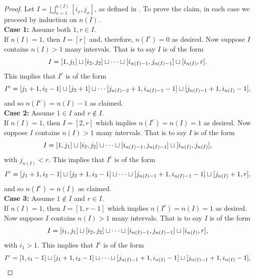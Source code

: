 \documentclass[10pt]{article}
\begin{document}
\begin{proof}
    Let $I=\bigsqcup_{x=1}^{n(I)}[i_x,j_x]$, as defined in . To prove the claim, in each case we proceed by induction on $n(I)$. \\ 
    \textbf{Case 1:} Assume both $1,r\in I$. \\
    If $n(I)=1$, then $I=[r]$ and, therefore, $n(I^c)=0$ as desired. Now suppose $I$ contains $n(I)>1$ many intervals. That is to say $I$ is of the form
    \begin{equation}
        I = [1,j_1]\sqcup [i_2,j_2] \sqcup \cdots \sqcup [i_{n(I)-1},j_{n(I)-1}]\sqcup [i_{n(I)},r].\notag
    \end{equation}
    This implies that $I^c$ is of the form 
    \begin{equation}
        I^c = [j_1+1,i_2-1] \sqcup [j_2+1] \sqcup \cdots [j_{n(I)-2}+1,i_{n(I)-1}-1] \sqcup [j_{n(I)-1}+1,i_{n(I)}-1],\notag
    \end{equation}
    and so $n(I^c)=n(I)-1$ as claimed.\\
    \textbf{Case 2:} Assume $1\in I$ and $r\notin I$. \\
    If $n(I)=1$, then $I=[2,r]$ which implies $n(I^c)=n(I)=1$ as desired. Now suppose $I$ contains $n(I)>1$ many intervals. That is to say $I$ is of the form
    \begin{equation}
        I = [1,j_1] \sqcup [i_2,j_2] \sqcup \cdots \sqcup [i_{n(I)-1},j_{n(I)-1}] \sqcup [i_{n(I)},j_{n(I)}],\notag
    \end{equation}
    with $j_{n(I)}<r$. This implies that $I^c$ is of the form
    \begin{equation}
        I^c = [j_1+1,i_2-1]\sqcup [j_2+1,i_3-1]\sqcup \cdots \sqcup [j_{n(I)-1}+1,i_{n(I)-1}-1] \sqcup [j_{n(I)}+1,r],\notag
    \end{equation}
    and so $n(I^c)=n(I)$ as claimed.\\
    \textbf{Case 3:} Assume $1\notin I$ and $r\in I$.\\
    If $n(I)=1$, then $I=[1,r-1]$ which implies $n(I^c)=n(I)=1$ as desired. Now suppose $I$ contains $n(I)>1$ many intervals. That is to say $I$ is of the form
    \begin{equation}
        I = [i_1,j_1] \sqcup [i_2,j_2] \sqcup \cdots \sqcup [i_{n(I)-1},j_{n(I)-1}]\sqcup [i_{n(I)},r],\notag
    \end{equation}
    with $i_1>1$. This implies that $I^c$ is of the form
    \begin{equation}
        I^c = [1,i_1-1] \sqcup [j_1+1,i_2-1] \sqcup \cdots \sqcup [j_{n(I)-1}+1,i_{n(I)}-1] \sqcup [j_{n(I)-1}+1,i_{n(I)}-1],\notag

\end{equation}
\end{proof}
\end{document}
